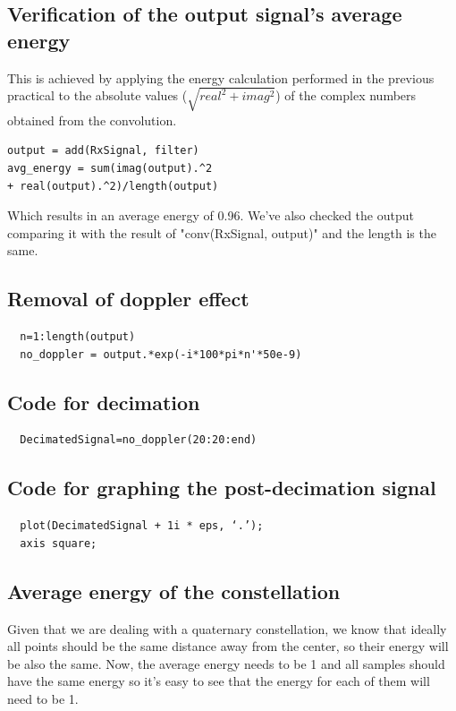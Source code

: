\documentclass[conference,9pt]{IEEEtran}
\begin{document}
\subsection{Verification of the output signal's average energy}
This is achieved by applying the energy calculation performed in the previous practical to the absolute values ($\sqrt{real^2+imag^2}$) of the complex numbers obtained from the convolution.

\begin{verbatim}
output = add(RxSignal, filter)
avg_energy = sum(imag(output).^2 
+ real(output).^2)/length(output)
\end{verbatim}

Which results in an average energy of 0.96. We've also checked the output comparing it with the result of "conv(RxSignal, output)" and the length is the same.

\subsection{Removal of doppler effect}
\begin{verbatim}
  n=1:length(output)
  no_doppler = output.*exp(-i*100*pi*n'*50e-9)
\end{verbatim}

\subsection{Code for decimation}
\begin{verbatim}
  DecimatedSignal=no_doppler(20:20:end)
\end{verbatim}

\subsection{Code for graphing the post-decimation signal}
\begin{verbatim}
  plot(DecimatedSignal + 1i * eps, ‘.’);
  axis square;
\end{verbatim}

\subsection{Average energy of the constellation}
Given that we are dealing with a quaternary constellation, we know that ideally all points should be the same distance away from the center, so their energy will be also the same. Now, the average energy needs to be 1 and all samples should have the same energy so it's easy to see that the energy for each of them will need to be 1.
\end{document}
